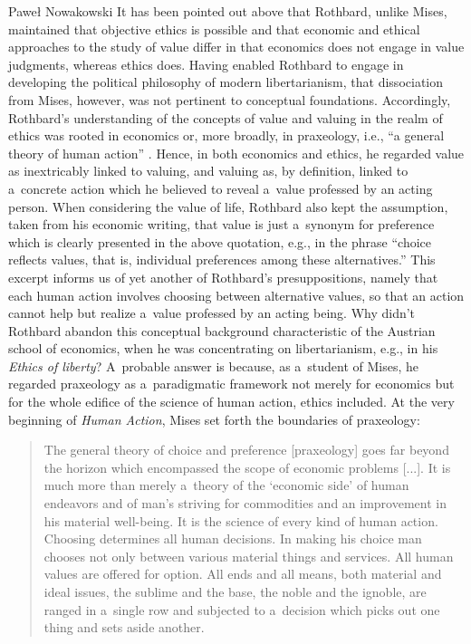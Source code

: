 \begin{artengenv}{Paweł Nowakowski}
It has been pointed out above that Rothbard, unlike Mises, maintained that objective ethics is possible and that economic and ethical approaches to the study of value differ in that economics does not engage in value judgments, whereas ethics does. Having enabled Rothbard to engage in developing the political philosophy of modern libertarianism, that dissociation from Mises, however, was not pertinent to conceptual foundations. Accordingly, Rothbard's understanding of the concepts of value and valuing in the realm of ethics was rooted in economics or, more broadly, in praxeology, i.e., ``a general theory of human action'' 
\parencite[][p.7]{Mises2008Human}. %
 Hence, in both economics and ethics, he regarded value as inextricably linked to valuing, and valuing as, by definition, linked to a~concrete action which he believed to reveal a~value professed by an acting person. When considering the value of life, Rothbard also kept the assumption, taken from his economic writing, that value is just a~synonym for preference which is clearly presented in the above quotation, e.g., in the phrase ``choice reflects values, that is, individual preferences among these alternatives.'' This excerpt informs us of yet another of Rothbard's presuppositions, namely that each human action involves choosing between alternative values, so that an action cannot help but realize a~value professed by an acting being. Why didn't Rothbard abandon this conceptual background characteristic of the Austrian school of economics, when he was concentrating on libertarianism, e.g., in his \textit{Ethics of liberty}? A~probable answer is because, as a~student of Mises, he regarded praxeology as a~paradigmatic framework not merely for economics but for the whole edifice of the science of human action, ethics included. At the very beginning of \textit{Human Action}, Mises 
\parencite*[][p.3]{Mises2008Human} %
 set forth the boundaries of praxeology:

\begin{quote}
The general theory of choice and preference [praxeology] goes far beyond the horizon which encompassed the scope of economic problems [...]. It is much more than merely a~theory of the ‘economic side' of human endeavors and of man's striving for commodities and an improvement in his material well-being. It is the science of every kind of human action. Choosing determines all human decisions. In making his choice man chooses not only between various material things and services. All human values are offered for option. All ends and all means, both material and ideal issues, the sublime and the base, the noble and the ignoble, are ranged in a~single row and subjected to a~decision which picks out one thing and sets aside another.
\end{quote}




\end{artengenv}
